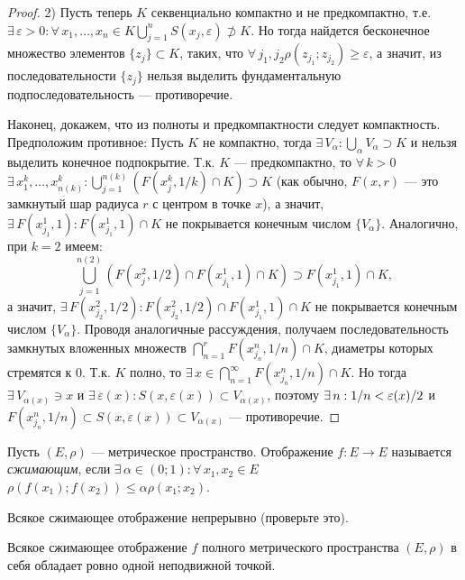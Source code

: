 \documentclass[10pt]{article}
\newcommand*{\p}[1]{#1\nobreak\discretionary{}{\hbox{$\mathsurround=0pt #1$}}{}}
\begin{document}
\begin{proof}
2) Пусть теперь $K$ секвенциально компактно и не предкомпактно, т.е.
$\exists\,\varepsilon>0:\forall\,x_1,\ldots,x_n\in
K$\;\;$\bigcup\limits_{j=1}^n S(x_j,\varepsilon)\not\supset K$. Но
тогда найдется бесконечное множество элементов $\{z_j\}\subset K$,
таких, что
$\forall\,j_1,j_2$\;\;$\rho(z_{j_1};z_{j_2})\geqslant\varepsilon$, а
значит, из последовательности $\{z_j\}$ нельзя выделить
фундаментальную подпоследовательность --- противоречие.

Наконец, докажем, что из полноты и предкомпактности следует
компактность. Предположим противное: Пусть $K$ не компактно, тогда
$\exists\,V_\alpha: \bigcup\limits_\alpha V_\alpha\supset K$ и
нельзя выделить конечное подпокрытие. Т.к. $K$ --- предкомпактно, то
$\forall\,k>0$\;\;$\exists\,x_1^k,\ldots,x_{n(k)}^k:\bigcup\limits_
{j=1}^{n(k)}(F(x_j^k,1/k)\cap K)\supset K$ (как обычно, $F(x,r)$
--- это замкнутый шар радиуса $r$ с центром в точке $x$), а значит,
$\exists\,F(x_{j_1}^1,1):F(x_{j_1}^1,1)\cap K$ не покрывается
конечным числом $\{V_\alpha\}$. Аналогично, при $k=2$ имеем:
$$\bigcup\limits_{j=1}^{n(2)} (F(x_j^2,1/2)\cap F(x_{j_1}^1,1)\cap K)\supset F(x_{j_1}^1,1)
\cap K,$$ а значит, $\exists\,F(x_{j_2}^2,1/2):F(x_{j_2}^2,1/2)\cap
F(x_{j_1}^1,1)\cap K$ не покрывается конечным числом $\{V_\alpha\}$.
Проводя аналогичные рассуждения, получаем последовательность
замкнутых вложенных множеств $\bigcap\limits_{n=1}^r
F(x^n_{j_n},1/n)\cap K$, диаметры которых стремятся к 0. Т.к. $K$
полно, то $\exists\,x\in\bigcap\limits_{n=1}^\infty
F(x_{j_n}^n,1/n)\cap K$. Но тогда $\exists\,V_{\alpha(x)}\ni x$ и
$\exists\,\varepsilon(x): S(x,\varepsilon(x))\subset V_{\alpha(x)}$,
поэтому $\exists\,n: 1/n\p<\varepsilon(x)/2$ и
$F(x_{j_n}^n,1/n)\subset S(x,\varepsilon(x))\subset V_{\alpha(x)}$
--- противоречие.
\end{proof}

\begin{df}
Пусть $(E,\rho)$ --- метрическое пространство. Отображение $f\colon
E\to E$ называется \emph{сжимающим}, если
$\exists\,\alpha\in(0;1):\forall\,x_1,x_2\in E$ \;\;
$\rho(f(x_1);f(x_2))\leqslant\alpha\rho(x_1;x_2)$.
\end{df}

Всякое сжимающее отображение непрерывно (проверьте это).

\begin{theorem}[Пикар]
Всякое сжимающее отображение $f$ полного ме\-трического пространства
$(E,\rho)$ в себя обладает ровно одной неподвижной точкой.
\end{theorem}
\end{document}
